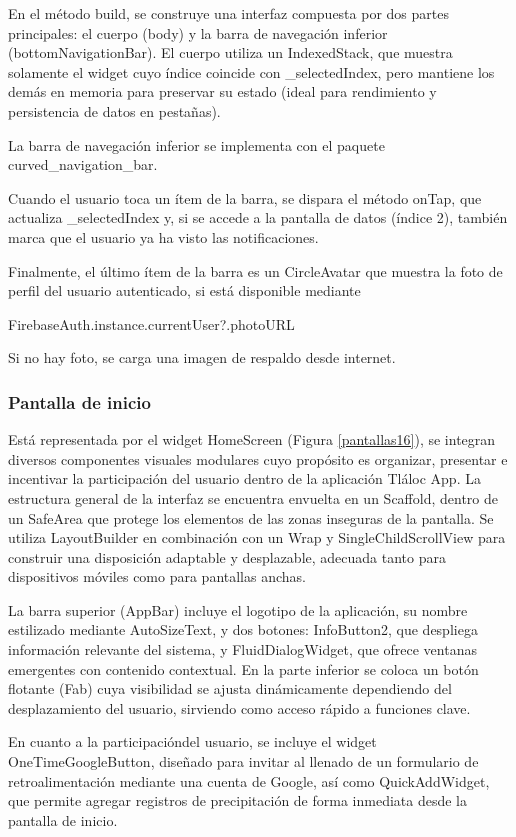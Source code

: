 En el método build, se construye una interfaz compuesta por dos partes principales: el cuerpo (body) y la barra de navegación inferior (bottomNavigationBar). El cuerpo utiliza un IndexedStack, que muestra solamente el widget cuyo índice coincide con \_selectedIndex, pero mantiene los demás en memoria para preservar su estado (ideal para rendimiento y persistencia de datos en pestañas).

La barra de navegación inferior se implementa con el paquete curved\_navigation\_bar.

Cuando el usuario toca un ítem de la barra, se dispara el método onTap, que actualiza \_selectedIndex y, si se accede a la pantalla de datos (índice 2), también marca que el usuario ya ha visto las notificaciones.

Finalmente, el último ítem de la barra es un CircleAvatar que muestra la foto de perfil del usuario autenticado, si está disponible mediante 
\begin{center}
  FirebaseAuth.instance.currentUser?.photoURL
\end{center}
Si no hay foto, se carga una imagen de respaldo desde internet.

\newpage
\subsubsection*{Pantalla de inicio} 

Está representada por el widget HomeScreen (Figura \ref{pantallas16}), se integran diversos componentes visuales modulares cuyo propósito es organizar, presentar e incentivar la participación del usuario dentro de la aplicación Tláloc App. La estructura general de la interfaz se encuentra envuelta en un Scaffold, dentro de un SafeArea que protege los elementos de las zonas inseguras de la pantalla. Se utiliza LayoutBuilder en combinación con un Wrap y SingleChildScrollView para construir una disposición adaptable y desplazable, adecuada tanto para dispositivos móviles como para pantallas anchas.

La barra superior (AppBar) incluye el logotipo de la aplicación, su nombre estilizado mediante AutoSizeText, y dos botones: InfoButton2, que despliega información relevante del sistema, y FluidDialogWidget, que ofrece ventanas emergentes con contenido contextual. En la parte inferior se coloca un botón flotante (Fab) cuya visibilidad se ajusta dinámicamente dependiendo del desplazamiento del usuario, sirviendo como acceso rápido a funciones clave.

En cuanto a la participacióndel usuario, se incluye el widget OneTimeGoogleButton, diseñado para invitar al llenado de un formulario de retroalimentación mediante una cuenta de Google, así como QuickAddWidget, que permite agregar registros de precipitación de forma inmediata desde la pantalla de inicio.

